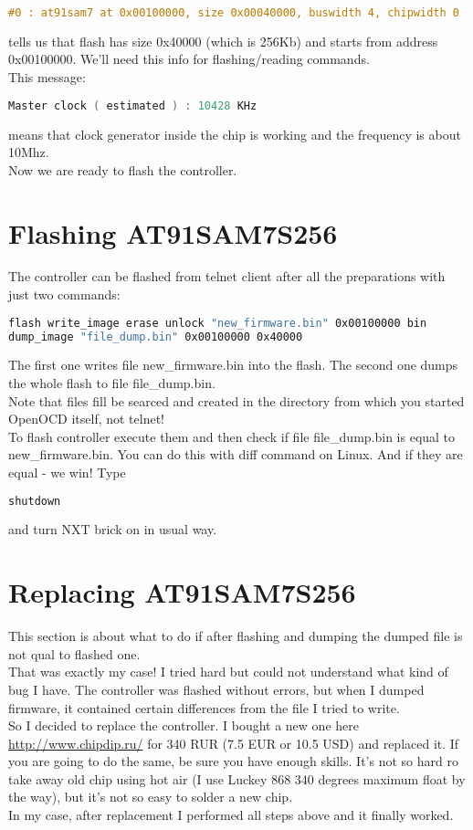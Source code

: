 \documentclass[11pt]{article}
\begin{document}
		\begin{lstlisting}[language=C]
#0 : at91sam7 at 0x00100000, size 0x00040000, buswidth 4, chipwidth 0
		\end{lstlisting}
		tells us that flash has size 0x40000 (which is 256Kb) and starts from address 0x00100000. We'll need this info for flashing/reading commands.\\
		This message:
		\begin{lstlisting}[language=C]
Master clock ( estimated ) : 10428 KHz
		\end{lstlisting}
		means that clock generator inside the chip is working and the frequency is about 10Mhz.\\

		Now we are ready to flash the controller.
		
	\section{Flashing AT91SAM7S256}
		The controller can be flashed from telnet client after all the preparations with just two commands:
		\begin{lstlisting}[language=bash]
flash write_image erase unlock "new_firmware.bin" 0x00100000 bin
dump_image "file_dump.bin" 0x00100000 0x40000
		\end{lstlisting}
		The first one writes file new\_firmware.bin into the flash. The second one dumps the whole flash to file file\_dump.bin.\\
		Note that files fill be searced and created in the directory from which you started OpenOCD itself, not telnet!\\
		To flash controller execute them and then check if file file\_dump.bin is equal to new\_firmware.bin. You can do this with diff command on Linux. And if they are equal - we win! Type
		\begin{lstlisting}[language=bash]
shutdown
		\end{lstlisting}
		and turn NXT brick on in usual way.
	\section{Replacing AT91SAM7S256}
		This section is about what to do if after flashing and dumping the dumped file is not qual to flashed one.\\
		That was exactly my case! I tried hard but could not understand what kind of bug I have. The controller was flashed without errors, but when I dumped firmware, it contained certain differences from the file I tried to write.\\
		So I decided to replace the controller. I bought a new one here \url{http://www.chipdip.ru/} for 340 RUR (7.5 EUR or 10.5 USD) and replaced it. If you are going to do the same, be sure you have enough skills. It's not so hard ro take away old chip using hot air (I use Luckey 868 340 degrees maximum float by the way), but it's not so easy to solder a new chip.\\
		In my case, after replacement I performed all steps above and it finally worked.
\end{document}
